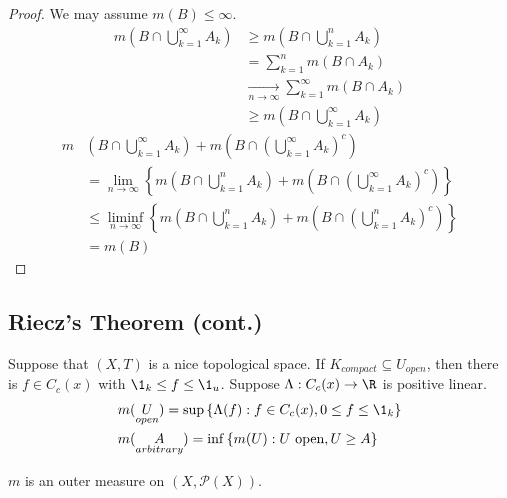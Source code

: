 \begin{proof}
	We may assume $m(B) \leq \infty$.
	\begin{align*}
	  m \left(B \cap \bigcup_{k = 1}^{\infty} A_k \right) & \geq m \left(B \cap \bigcup_{k = 1}^{n} A_k \right) \\
		& = \sum_{k = 1}^{n} m(B \cap A_k) \tag{Step 3$'$} \\
		& \xrightarrow[n \to \infty]{} \sum_{k = 1}^{\infty} m(B \cap A_k) \\
		& \geq m \left( B \cap \bigcup_{k = 1}^{\infty} A_k \right)
	\end{align*}
	\begin{align*}
	  m & \left(B \cap \bigcup_{k = 1}^{\infty} A_k \right) + m \left(B \cap \left( \bigcup_{k = 1}^{\infty} A_k\right)^{c}\right) \\
		& = \lim_{n \to \infty} \left\{ m \left( B \cap \bigcup_{k = 1}^{n} A_k \right) + m \left(B \cap \left(\bigcup_{k = 1}^{\infty} A_k\right)^{c}\right)\right\} \\
		& \leq \liminf_{n \to \infty} \left\{ m \left(B \cap \bigcup_{k = 1}^{n} A_k\right) + m \left(B \cap \left(\bigcup_{k = 1}^{n} A_k\right)^{c}\right)\right\} \\
		& = m(B)
	\end{align*}
\end{proof}

\subsection{Riecz's Theorem (cont.)}

Suppose that $(X,T)$ is a  nice topological space.
If $K_{compact} \subseteq U_{open}$, then there is $f \in C_c(x)$ with $\1_k \leq f \leq \1_u$.
Suppose $\Lambda : C_c(x) \to \R$ is positive linear.
\begin{align*}
  & m(\underset{open}{U}) = \sup \left\{\Lambda(f) : f \in C_c(x), 0 \leq f \leq \1_k \right\} \\
  & m(\underset{arbitrary}{A}) = \inf \left\{ m(U): U \textrm{ open}, U \geq A\right\} \\
\end{align*}

\begin{lemma}
  $m$ is an outer measure on $(X, \mathcal{P}(X))$.
\end{lemma}

